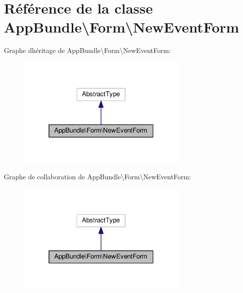\hypertarget{classAppBundle_1_1Form_1_1NewEventForm}{}\section{Référence de la classe App\+Bundle\textbackslash{}Form\textbackslash{}New\+Event\+Form}
\label{classAppBundle_1_1Form_1_1NewEventForm}


Graphe d\textquotesingle{}héritage de App\+Bundle\textbackslash{}Form\textbackslash{}New\+Event\+Form\+:\nopagebreak
\begin{figure}[H]
\begin{center}
\leavevmode
\includegraphics[width=241pt]{classAppBundle_1_1Form_1_1NewEventForm__inherit__graph}
\end{center}
\end{figure}


Graphe de collaboration de App\+Bundle\textbackslash{}Form\textbackslash{}New\+Event\+Form\+:\nopagebreak
\begin{figure}[H]
\begin{center}
\leavevmode
\includegraphics[width=241pt]{classAppBundle_1_1Form_1_1NewEventForm__coll__graph}
\end{center}
\end{figure}
